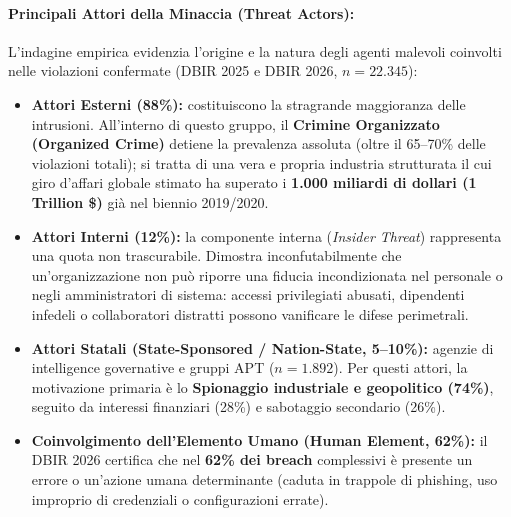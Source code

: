 \documentclass[../../main.tex]{subfiles}
\begin{document}
\paragraph{Principali Attori della Minaccia (Threat Actors):}
L'indagine empirica evidenzia l'origine e la natura degli agenti malevoli coinvolti nelle violazioni confermate (DBIR 2025 e DBIR 2026, $n=22.345$):
\begin{itemize}
    \item \textbf{Attori Esterni (88\%):} costituiscono la stragrande maggioranza delle intrusioni. All'interno di questo gruppo, il \textbf{Crimine Organizzato (Organized Crime)} detiene la prevalenza assoluta (oltre il 65--70\% delle violazioni totali); si tratta di una vera e propria industria strutturata il cui giro d'affari globale stimato ha superato i \textbf{1.000 miliardi di dollari (1 Trillion \$)} già nel biennio 2019/2020.
    \item \textbf{Attori Interni (12\%):} la componente interna (\textit{Insider Threat}) rappresenta una quota non trascurabile. Dimostra inconfutabilmente che un'organizzazione non può riporre una fiducia incondizionata nel personale o negli amministratori di sistema: accessi privilegiati abusati, dipendenti infedeli o collaboratori distratti possono vanificare le difese perimetrali.
    \item \textbf{Attori Statali (State-Sponsored / Nation-State, 5--10\%):} agenzie di intelligence governative e gruppi APT ($n=1.892$). Per questi attori, la motivazione primaria è lo \textbf{Spionaggio industriale e geopolitico (74\%)}, seguito da interessi finanziari (28\%) e sabotaggio secondario (26\%).
    \item \textbf{Coinvolgimento dell'Elemento Umano (Human Element, 62\%):} il DBIR 2026 certifica che nel \textbf{62\% dei breach} complessivi è presente un errore o un'azione umana determinante (caduta in trappole di phishing, uso improprio di credenziali o configurazioni errate).
\end{itemize}
\end{document}
